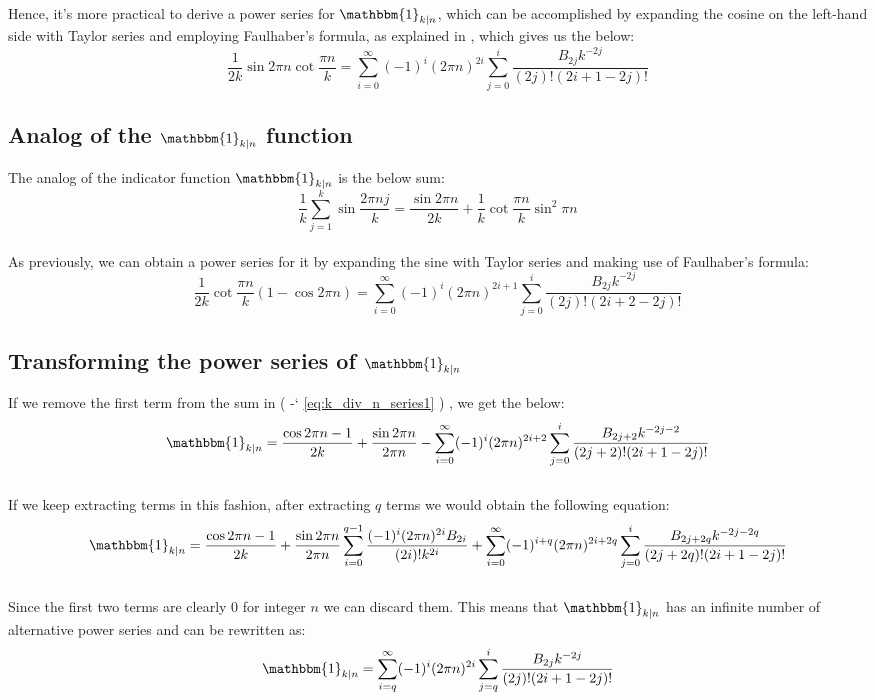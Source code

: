 \documentclass[12pt]{article}
\newcommand*{\citena}[1]{%
\begingroup
[\color{Green}
\romannumeral-`\x %
\setcitestyle{numbers}%
\cite{#1}%
\endgroup
]\ignorespacesafterend
}
\newcommand*{\eqrefe}[1]{%
\begingroup
(\color{BrickRed}
\romannumeral-`\x %
\setcitestyle{numbers}%
\ref{eq:#1}%
\endgroup
)\ignorespacesafterend
}
\begin{document}
\indent Hence, it's more practical to derive a power series for $\mathbbm{1}_{k|n}$, which can be accomplished by expanding the cosine on the left-hand side with Taylor series and employing Faulhaber's formula, as explained in \citena{GHN}, which gives us the below:
\begin{equation} \label{eq:k_div_n_series1} 
\frac{1}{2k}\sin{2\pi n}\cot{\frac{\pi n}{k}}=\sum_{i=0}^{\infty}(-1)^i(2\pi n)^{2i}\sum_{j=0}^{i}\frac{B_{2j} k^{-2j}}{(2j)!(2i+1-2j)!}
\end{equation}

\subsection{Analog of the $\mathbbm{1}_{k|n}$ function}
The analog of the indicator function $\mathbbm{1}_{k|n}$ is the below sum:
\begin{equation} \label{eq:sum_sine1} \nonumber
\frac{1}{k}\sum_{j=1}^{k}\sin{\frac{2\pi nj}{k}}=\frac{\sin{2\pi n}}{2k}+\frac{1}{k}\cot{\frac{\pi n}{k}}\sin^2{\pi n}
\end{equation}\\
\indent As previously, we can obtain a power series for it by expanding the sine with Taylor series and making use of Faulhaber's formula:
\begin{equation} \label{eq:sum_sine4} \nonumber
\frac{1}{2k}\cot{\frac{\pi n}{k}}(1-\cos{2\pi n})=\sum_{i=0}^{\infty}(-1)^i(2\pi n)^{2i+1}\sum_{j=0}^{i}\frac{B_{2j} k^{-2j}}{(2j)!(2i+2-2j)!}
\end{equation}

\subsection{Transforming the power series of $\mathbbm{1}_{k|n}$}
If we remove the first term from the sum in  \eqrefe{k_div_n_series1}, we get the below:
\begin{equation} \label{eq:k_div_n_series2} \nonumber
\mathbbm{1}_{k|n}=\frac{\cos{2\pi n}-1}{2k}+\frac{\sin{2\pi n}}{2\pi n}-
\sum_{i=0}^{\infty}(-1)^i (2\pi n)^{2i+2}\sum_{j=0}^{i} \frac{B_{2j+2}k^{-2j-2}}{(2j+2)!(2i+1-2j)!}
\end{equation}\\
\indent If we keep extracting terms in this fashion, after extracting $q$ terms we would obtain the following equation:
\begin{equation} \label{eq:k_div_n_series4}
\mathbbm{1}_{k|n}=\frac{\cos{2\pi n}-1}{2k}+\frac{\sin{2\pi n}}{2\pi n}\sum_{i=0}^{q-1}\frac{(-1)^i (2\pi n)^{2i} B_{2i}}{(2i)!k^{2i}}+\sum_{i=0}^{\infty} (-1)^{i+q}(2\pi n)^{2i+2q}\sum_{j=0}^{i} \frac{B_{2j+2q}k^{-2j-2q}}{(2j+2q)!(2i+1-2j)!} \nonumber
\end{equation}\\
\indent Since the first two terms are clearly 0 for integer $n$ we can discard them. This means that $\mathbbm{1}_{k|n}$ has an infinite number of alternative power series and can be rewritten as:
\begin{equation} \label{eq:k_div_n_series_gen} 
\mathbbm{1}_{k|n}=\sum_{i=q}^{\infty} (-1)^{i}(2\pi n)^{2i}\sum_{j=q}^{i} \frac{B_{2j}k^{-2j}}{(2j)!(2i+1-2j)!}
\end{equation}
\end{document}

